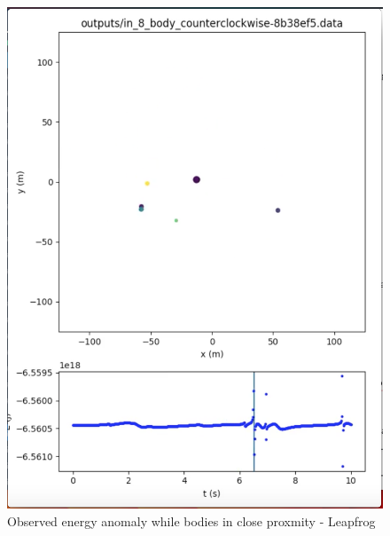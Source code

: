 \documentclass[11pt,a4paper]{article}
\begin{document}
\begin{figure}[b]
\caption{Observed energy anomaly while bodies in close proxmity - Leapfrog}
\centering
\label{fig:anomaly}
\includegraphics[width=\textwidth]{energy_anomaly}
\end{figure} 
\end{document}
